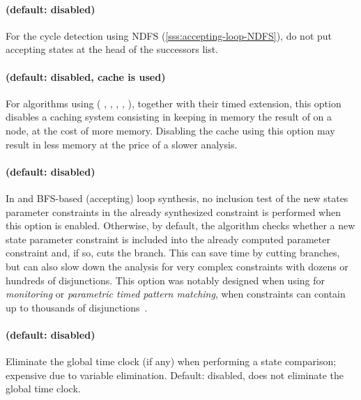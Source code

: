 \paragraph{ (default: disabled)}
For the cycle detection using NDFS (\cref{sss:accepting-loop-NDFS}),
do not put accepting states at the head of the successors list.

\paragraph{ (default: disabled, \ie{} cache is used)}
For algorithms using  (\ie{} , , , , ), together with their timed extension, this option disables a caching system consisting in keeping in memory the result of  on a node, at the cost of more memory.
Disabling the cache using this option may result in less memory at the price of a slower analysis.


\paragraph{ (default: disabled)}
In \EFsynth{} and BFS-based (accepting) loop synthesis, no inclusion test of the new states parameter constraints in the already synthesized constraint is performed when this option is enabled.
Otherwise, by default, the algorithm checks whether a new state parameter constraint is included into the already computed parameter constraint and, if so, cuts the branch.
This can save time by cutting branches, but can also slow down the analysis for very complex constraints with dozens or hundreds of disjunctions.
This option was notably designed when using \imitator{} for \emph{monitoring} or \emph{parametric timed pattern matching}, when constraints can contain up to thousands of disjunctions~\cite{AHW18}.



\paragraph{ (default: disabled)}
Eliminate the global time clock (if any) when performing a state comparison; expensive due to variable elimination.
Default: disabled, \ie{} does not eliminate the global time clock.

